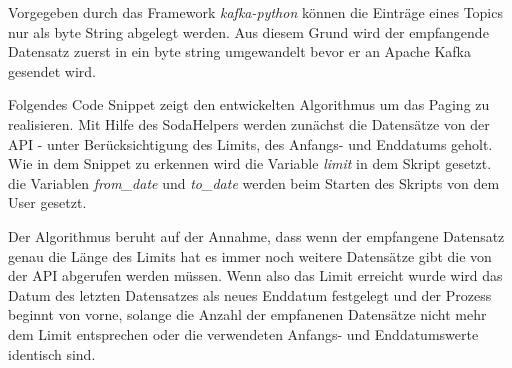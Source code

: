 Vorgegeben durch das Framework \textit{kafka-python} können die Einträge eines Topics nur als byte String abgelegt werden.
Aus diesem Grund wird der empfangende Datensatz zuerst in ein byte string umgewandelt bevor er an Apache Kafka gesendet wird.

Folgendes Code Snippet zeigt den entwickelten Algorithmus um das Paging zu realisieren.
Mit Hilfe des SodaHelpers werden zunächst die Datensätze von der API - unter Berücksichtigung des Limits, des Anfangs- und Enddatums geholt.
Wie in dem Snippet zu erkennen wird die Variable \textit{limit} in dem Skript gesetzt.
die Variablen \textit{from\_date} und \textit{to\_date} werden beim Starten des Skripts von dem User gesetzt.

Der Algorithmus beruht auf der Annahme, dass wenn der empfangene Datensatz genau die Länge des Limits hat es immer noch weitere Datensätze gibt die von der API abgerufen werden müssen.
Wenn also das Limit erreicht wurde wird das Datum des letzten Datensatzes als neues Enddatum festgelegt und der Prozess beginnt von vorne, solange die Anzahl der empfanenen Datensätze nicht mehr dem Limit entsprechen
oder die verwendeten Anfangs- und Enddatumswerte identisch sind.


